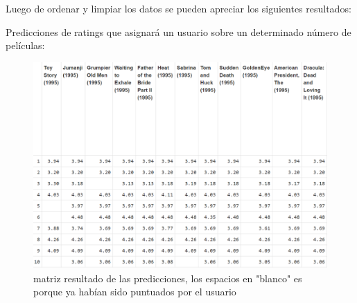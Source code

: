 \documentclass{sciposter}
\begin{document}
\begin{multicols}{3}
Luego de ordenar y limpiar los datos se pueden apreciar los siguientes resultados: 

Predicciones de ratings que asignar\'a un usuario sobre un determinado n\'umero de pel\'iculas:

\begin{figure}
\begin{center}

 	\includegraphics[scale=0.75]{predicciones}
\end{center}
\caption{ matriz resultado de las predicciones, los espacios en "blanco" es porque ya hab\'ian sido puntuados por el usuario}\label{fig:predicciones}
\end{figure}


\begin{figure}
\begin{center}


\end{center}
\end{figure}
\end{multicols}
\end{document}
